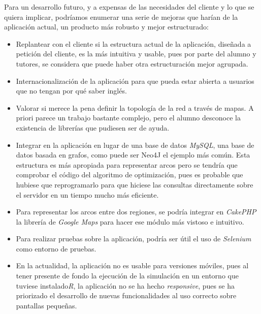 Para un desarrollo futuro, y a expensas de las necesidades del cliente y lo que se quiera implicar, podríamos enumerar una serie de mejoras que harían de la aplicación actual, un producto más robusto y mejor estructurado:

\begin{itemize}
	
	\item Replantear con el cliente si la estructura actual de la aplicación, diseñada a petición del cliente, es la más intuitiva y usable, pues por parte del alumno y tutores, se considera que puede haber otra estructuración mejor agrupada.
	
	\item Internacionalización de la aplicación para que pueda estar abierta a usuarios que no tengan por qué saber inglés.
	
	\item Valorar si merece la pena definir la topología de la red a través de mapas. A priori parece un trabajo bastante complejo, pero el alumno desconoce la existencia de librerías que pudiesen ser de ayuda.
	
	\item Integrar en la aplicación en lugar de una base de datos \textit{MySQL}, una base de datos basada en grafos, como puede ser Neo4J el ejemplo más común. Esta estructura es más apropiada para representar arcos pero se tendría que comprobar el código del algoritmo de optimización, pues es probable que hubiese que reprogramarlo para que hiciese las consultas directamente sobre el servidor en un tiempo mucho más eficiente.
	
	\item Para representar los arcos entre dos regiones, se podría integrar en \textit{CakePHP} la librería de \textit{Google Maps} para hacer ese módulo más vistoso e intuitivo.
	
	\item Para realizar pruebas sobre la aplicación, podría ser útil el uso de \textit{Selenium} como entorno de pruebas.
	
	\item En la actualidad, la aplicación no es usable para versiones móviles, pues al tener presente de fondo la ejecución de la simulación en un entorno que tuviese instalado\textit{R}, la aplicación no se ha hecho \textit{responsive}, pues se ha priorizado el desarrollo de nuevas funcionalidades al uso correcto sobre pantallas pequeñas.
	
	
\end{itemize}


